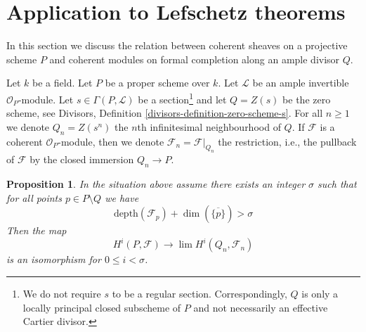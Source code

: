 \documentclass{stacks-project}
\theoremstyle{plain}
\newtheorem{proposition}[subsection]{Proposition}
\theoremstyle{definition}
\theoremstyle{remark}
\numberwithin{equation}{subsection}
\def\lim{\mathop{\mathrm{lim}}\nolimits}
\begin{document}
\section{Application to Lefschetz theorems}
\label{section-lefschetz}

\noindent
In this section we discuss the relation between coherent sheaves on a
projective scheme $P$ and coherent modules on formal completion along
an ample divisor $Q$.

\medskip\noindent
Let $k$ be a field. Let $P$ be a proper scheme over $k$.
Let $\mathcal{L}$ be an ample invertible $\mathcal{O}_P$-module.
Let $s \in \Gamma(P, \mathcal{L})$ be a section\footnote{We do not
require $s$ to be a regular section. Correspondingly, $Q$ is only
a locally principal closed subscheme of $P$ and not necessarily an effective
Cartier divisor.} and let
$Q = Z(s)$ be the zero scheme, see
Divisors, Definition \ref{divisors-definition-zero-scheme-s}.
For all $n \geq 1$ we denote $Q_n = Z(s^n)$
the $n$th infinitesimal neighbourhood of $Q$.
If $\mathcal{F}$ is a coherent $\mathcal{O}_P$-module, then we denote
$\mathcal{F}_n = \mathcal{F}|_{Q_n}$ the restriction, i.e.,
the pullback of $\mathcal{F}$ by the closed immersion
$Q_n \to P$.

\begin{proposition}
\label{proposition-lefschetz}
In the situation above assume there exists an integer $\sigma$ such that
for all points $p \in P \setminus Q$ we have
$$
\text{depth}(\mathcal{F}_p) + \dim(\overline{\{p\}}) > \sigma
$$
Then the map
$$
H^i(P, \mathcal{F}) \longrightarrow \lim H^i(Q_n, \mathcal{F}_n)
$$
is an isomorphism for $0 \leq i < \sigma$.
\end{proposition}
\end{document}
